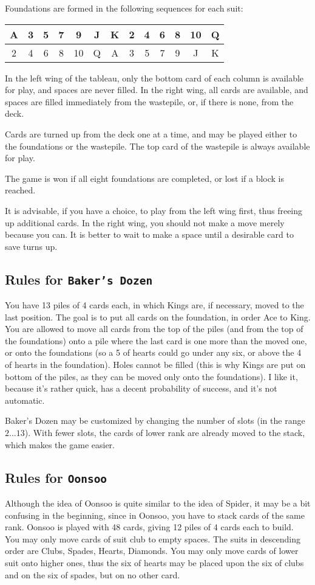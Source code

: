 Foundations are formed in the following sequences for
each suit:

\smallskip
\begin{tabular}{|c|c|c|c|c|c|c|c|c|c|c|c|c|}
\hline
          A&3&5&7&9&J&K&2&4&6&8&10&Q\\
\hline
          2&4&6&8&10&Q&A&3&5&7&9&J&K\\
\hline
\end{tabular}

\smallskip
In the left wing of the tableau, only the bottom card
of each column is available for play, and spaces are
never filled.  In the right wing, all cards are
available, and spaces are filled immediately from the
wastepile, or, if there is none, from the deck.

Cards are turned up from the deck one at a time, and
may be played either to the foundations or the
wastepile.  The top card of the wastepile is always
available for play.

The game is won if all eight foundations are
completed, or lost if a block is reached.

It is advisable, if you have a choice, to play from
the left wing first, thus freeing up additional cards.
In the right wing, you should not make a move merely
because you can.  It is better to wait to make a space
until a desirable card to save turns up.

\subsection{Rules for {\tt Baker's Dozen}}
You have 13 piles of 4 cards each, in which Kings are,
if necessary, moved to the last position. The goal is
to put all cards on the foundation, in order Ace to King.
You are allowed to move all cards from the top of the
piles (and from the top of the foundations) onto a pile
where the last card is one more than the moved one, or onto
the foundations (so a 5 of hearts could go under any six, or above the 4
of hearts in the foundation). Holes cannot be filled
(this is why Kings are put on bottom of the piles, as they
can be moved only onto the foundations). I like it, because
it's rather quick, has a decent probability of success,
and it's not automatic.

Baker's Dozen may be customized by changing the number
of slots (in the range $2\ldots 13$). With fewer slots, the
cards of lower rank are already moved to the stack,
which makes the game easier.

\subsection{Rules for {\tt Oonsoo}}
Although the idea of Oonsoo is quite similar to the idea of Spider, it may be a
bit confusing in the beginning, since in Oonsoo, you have to stack cards of the
same rank. Oonsoo is played with 48 cards, giving 12 piles of 4 cards each to
build. You may only move cards of suit club to empty spaces.  The suits in
descending order are Clubs, Spades, Hearts, Diamonds.  You may only move cards
of lower suit onto higher ones, thus the six of hearts may be placed upon the
six of clubs and on the six of spades, but on no other card.

